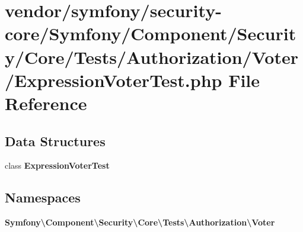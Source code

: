 \section{vendor/symfony/security-\/core/\+Symfony/\+Component/\+Security/\+Core/\+Tests/\+Authorization/\+Voter/\+Expression\+Voter\+Test.php File Reference}
\label{_expression_voter_test_8php}
\subsection*{Data Structures}
\begin{DoxyCompactItemize}
\item 
class {\bf Expression\+Voter\+Test}
\end{DoxyCompactItemize}
\subsection*{Namespaces}
\begin{DoxyCompactItemize}
\item 
 {\bf Symfony\textbackslash{}\+Component\textbackslash{}\+Security\textbackslash{}\+Core\textbackslash{}\+Tests\textbackslash{}\+Authorization\textbackslash{}\+Voter}
\end{DoxyCompactItemize}
